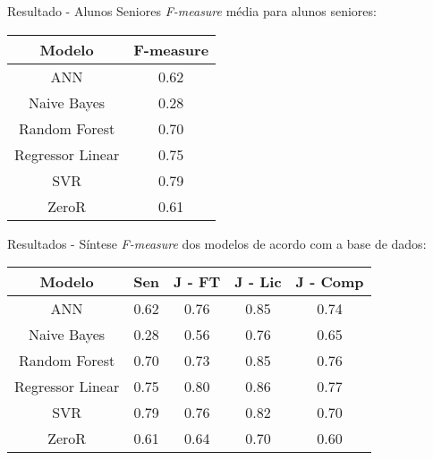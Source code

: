 \begin{frame}{Resultado - Alunos Seniores}
    \textit{F-measure} média para alunos seniores: 
    \begin{table}
    \begin{center}
    \begin{tabular}[c]{| c | c |}
        \hline
        \textbf{Modelo} & \textbf{F-measure} \\
        \hline
        ANN              & 0.62 \\
        \hline
        Naive Bayes      & 0.28 \\
        \hline
        Random Forest    & 0.70 \\
        \hline
        Regressor Linear & 0.75 \\
        \hline
        SVR              & 0.79 \\
        \hline
        ZeroR            & 0.61 \\
        \hline
    \end{tabular}
    \end{center}
    \end{table}
\end{frame}

\begin{frame}{Resultados - Síntese}
    \textit{F-measure} dos modelos de acordo com a base de dados: 
    \begin{table}
    \begin{center}
    \begin{tabular}[c]{| c | c | c | c | c |}
        \hline
        \textbf{Modelo} & \textbf{Sen} & \textbf{J - FT} & 
        \textbf{J - Lic} & \textbf{J - Comp} \\
        \hline
        ANN              & 0.62 & 0.76 & 0.85 & 0.74 \\
        \hline
        Naive Bayes      & 0.28 & 0.56 & 0.76 & 0.65 \\
        \hline
        Random Forest    & 0.70 & 0.73 & 0.85 & 0.76 \\
        \hline
        Regressor Linear & 0.75 & 0.80 & 0.86 & 0.77 \\
        \hline
        SVR              & 0.79 & 0.76 & 0.82 & 0.70 \\
        \hline
        ZeroR            & 0.61 & 0.64 & 0.70 & 0.60 \\
        \hline
    \end{tabular}
    \end{center}
    \end{table}
\end{frame}

